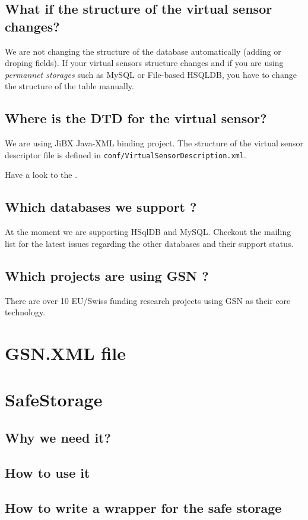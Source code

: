 \subsection{What if the structure of the virtual sensor changes?}
We are not changing the structure of the database automatically (adding or droping fields). If your virtual sensors structure
changes and if you are using \emph{permannet storages} such as MySQL or File-based HSQLDB, you have to change the structure of the
table manually.

\subsection{Where is the DTD for the virtual sensor?}
We are using JiBX Java-XML binding project. The structure of the virtual sensor descriptor file is defined in \texttt{conf/VirtualSensorDescription.xml}.

Have a look to the .

\subsection{Which databases we support ?}
At the moment we are supporting HSqlDB and MySQL. Checkout the mailing list for the latest issues regarding the other databases and their
support status.
\subsection{Which projects are using GSN ?}
There are over 10 EU/Swiss funding research projects using GSN as their core technology.
\section{GSN.XML file}
\section{SafeStorage}
\subsection{Why we need it? }
\subsection{How to use it }
\subsection{How to write a wrapper for the safe storage}
